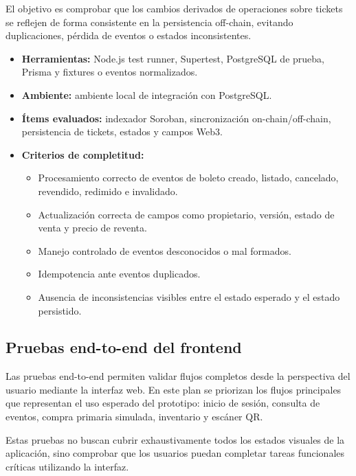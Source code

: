 \documentclass[12pt,letterpaper]{article}
\begin{document}
El objetivo es comprobar que los cambios derivados de operaciones sobre tickets se reflejen de forma consistente en la persistencia off-chain, evitando duplicaciones, pérdida de eventos o estados inconsistentes.

\begin{itemize}
    \item \textbf{Herramientas:} Node.js test runner, Supertest, PostgreSQL de prueba, Prisma y fixtures o eventos normalizados.
    \item \textbf{Ambiente:} ambiente local de integración con PostgreSQL.
    \item \textbf{Ítems evaluados:} indexador Soroban, sincronización on-chain/off-chain, persistencia de tickets, estados y campos Web3.
    \item \textbf{Criterios de completitud:}
    \begin{itemize}
        \item Procesamiento correcto de eventos de boleto creado, listado, cancelado, revendido, redimido e invalidado.
        \item Actualización correcta de campos como propietario, versión, estado de venta y precio de reventa.
        \item Manejo controlado de eventos desconocidos o mal formados.
        \item Idempotencia ante eventos duplicados.
        \item Ausencia de inconsistencias visibles entre el estado esperado y el estado persistido.
    \end{itemize}
\end{itemize}

\subsection{Pruebas end-to-end del frontend}

Las pruebas end-to-end permiten validar flujos completos desde la perspectiva del usuario mediante la interfaz web. En este plan se priorizan los flujos principales que representan el uso esperado del prototipo: inicio de sesión, consulta de eventos, compra primaria simulada, inventario y escáner QR.

Estas pruebas no buscan cubrir exhaustivamente todos los estados visuales de la aplicación, sino comprobar que los usuarios puedan completar tareas funcionales críticas utilizando la interfaz.
\end{document}
